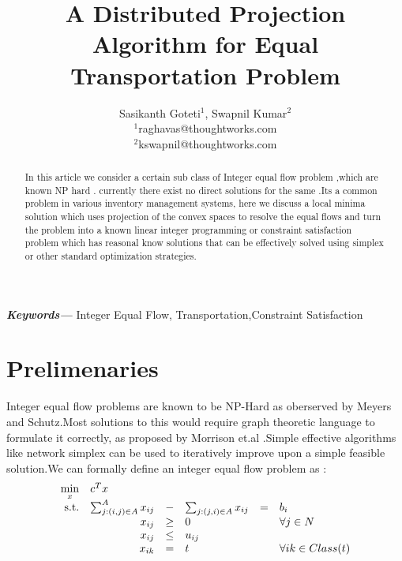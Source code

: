 \documentclass[a4paper]{article}
\title{A Distributed Projection Algorithm for Equal Transportation Problem}
\author{Sasikanth Goteti$^{1}$, Swapnil Kumar$^{2}$  \\
            \small $^{1}$raghavas@thoughtworks.com \\
            \small $^{2}$kswapnil@thoughtworks.com \\
    }
\date{} %
\providecommand{\keywords}[1]
    {
      \small	
      \textbf{\textit{Keywords---}} #1
    }
\begin{document}
    \maketitle
    
    \begin{abstract}
        In this article we consider a certain sub class of Integer equal flow problem ,which are known NP hard \cite{meyers}. 
        currently there exist no direct solutions for the same .Its a common problem in various inventory management systems,
        here we discuss a local minima solution which uses projection of the convex spaces to resolve the equal flows and turn 
        the problem into a known linear integer programming or constraint satisfaction problem which has reasonal know solutions that can be 
        effectively solved using simplex or other standard optimization strategies.
       \end{abstract}
    \keywords{Integer Equal Flow, Transportation,Constraint Satisfaction}
     
    \maketitle
    
    \section{Prelimenaries}
    Integer equal flow problems are known to be NP-Hard as oberserved by Meyers and Schutz\cite{meyers}.Most solutions to this would
    require graph theoretic language to formulate it correctly, as proposed by Morrison et.al \cite{Morrison2013ANS}.Simple effective
    algorithms like network simplex can be used to iteratively improve upon a simple feasible solution.We can formally define an
    integer equal flow problem as :
    \begin{equation}
        \begin{array}{rrclcl}
        \displaystyle \min_{x} & \multicolumn{3}{l}{c^T x} \\
        \textrm{s.t.} & \sum_{j:(i,j) \in A }^A x_{ij} & - & \sum_{j:(j,i) \in A } x_{ij} & = & b_i \\
        & x_{ij} & \geq & 0 & & \forall j \in N \\
        & x_{ij} & \leq & u_{ij} \\
        & x_{ik} &= & t && \forall {ik}\in Class(t)
        \end{array}
        \end{equation}
\end{document}
